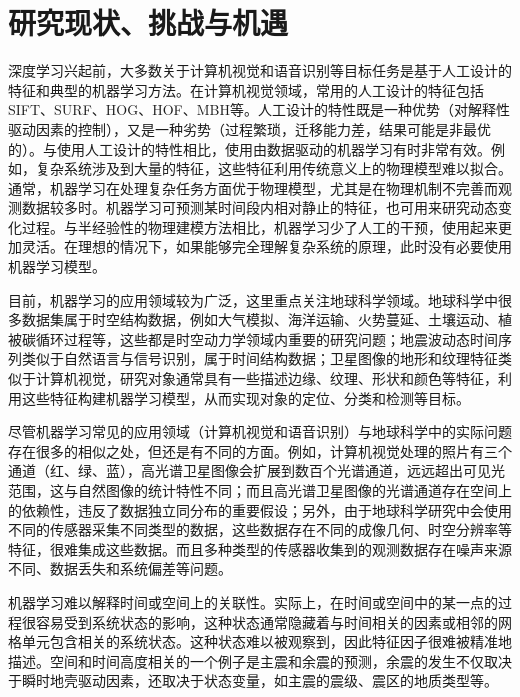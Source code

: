 \section{研究现状、挑战与机遇}\label{sec:intro_veiw}

深度学习兴起前，大多数关于计算机视觉和语音识别等目标任务是基于人工设计的特征和典型的机器学习方法。在计算机视觉领域，常用的人工设计的特征包括SIFT、SURF、HOG、HOF、MBH等。人工设计的特性既是一种优势（对解释性驱动因素的控制），又是一种劣势（过程繁琐，迁移能力差，结果可能是非最优的）。与使用人工设计的特性相比，使用由数据驱动的机器学习有时非常有效。例如，复杂系统涉及到大量的特征，这些特征利用传统意义上的物理模型难以拟合。通常，机器学习在处理复杂任务方面优于物理模型，尤其是在物理机制不完善而观测数据较多时。机器学习可预测某时间段内相对静止的特征，也可用来研究动态变化过程。与半经验性的物理建模方法相比，机器学习少了人工的干预，使用起来更加灵活。在理想的情况下，如果能够完全理解复杂系统的原理，此时没有必要使用机器学习模型。

目前，机器学习的应用领域较为广泛，这里重点关注地球科学领域。地球科学中很多数据集属于时空结构数据，例如大气模拟、海洋运输、火势蔓延、土壤运动、植被碳循环过程等，这些都是时空动力学领域内重要的研究问题\citep{mathieu2015deep,oh2015action}；地震波动态时间序列类似于自然语言与信号识别，属于时间结构数据\citep{perol2018convolutional,devries2018deep,rouet2017machine}；卫星图像的地形和纹理特征类似于计算机视觉，研究对象通常具有一些描述边缘、纹理、形状和颜色等特征，利用这些特征构建机器学习模型，从而实现对象的定位、分类和检测等目标\citep{lee1990neural}。

尽管机器学习常见的应用领域（计算机视觉和语音识别）与地球科学中的实际问题存在很多的相似之处，但还是有不同的方面。例如，计算机视觉处理的照片有三个通道（红、绿、蓝），高光谱卫星图像会扩展到数百个光谱通道，远远超出可见光范围，这与自然图像的统计特性不同；而且高光谱卫星图像的光谱通道存在空间上的依赖性，违反了数据独立同分布的重要假设；另外，由于地球科学研究中会使用不同的传感器采集不同类型的数据，这些数据存在不同的成像几何、时空分辨率等特征，很难集成这些数据。而且多种类型的传感器收集到的观测数据存在噪声来源不同、数据丢失和系统偏差等问题。

机器学习难以解释时间或空间上的关联性。实际上，在时间或空间中的某一点的过程很容易受到系统状态的影响，这种状态通常隐藏着与时间相关的因素或相邻的网格单元包含相关的系统状态。这种状态难以被观察到，因此特征因子很难被精准地描述。空间和时间高度相关的一个例子是主震和余震的预测，余震的发生不仅取决于瞬时地壳驱动因素，还取决于状态变量，如主震的震级、震区的地质类型等。

